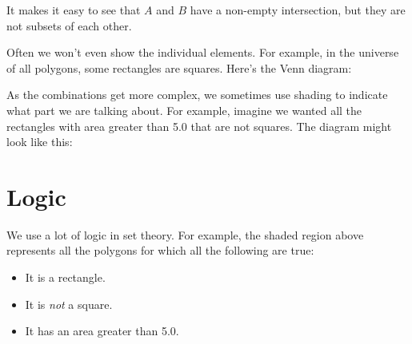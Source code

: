 
It makes it easy to see that $A$ and $B$ have a non-empty
intersection, but they are not subsets of each other.

Often we won't even show the individual elements. For example, in the
universe of all polygons, some rectangles are squares. Here's the Venn diagram:


As the combinations get more complex, we sometimes use shading to
indicate what part we are talking about.  For example, imagine we
wanted all the rectangles with area greater than 5.0 that are not
squares.  The diagram might look like this:



\section{Logic}

We use a lot of logic in set theory.  For example, the shaded region
above represents all the polygons for which all the following are
true:
\begin{itemize}
\item It is a rectangle.
\item It is \textit{not} a square.
\item It has an area greater than 5.0.
\end{itemize}

